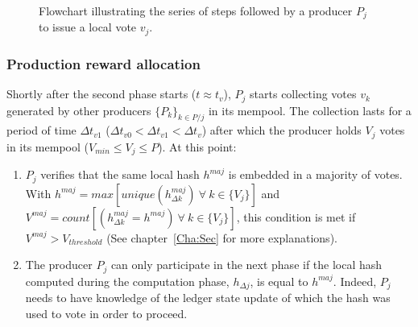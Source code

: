 \begin{enumerate}
\begin{figure}[H]
\label{fig:computation}
\caption{\label{fig:computation} Flowchart illustrating the series of steps followed by a producer $P_j$ to issue a local vote $v_j$.}
\end{figure}
\end{enumerate}

\subsubsection{Production reward allocation}

Shortly after the second phase starts ($t \approx t_v$), $P_j$ starts collecting votes $v_{k}$ generated by other producers $\{P_k\}_{k \in P/j}$ in its mempool. The collection lasts for a period of time $\Delta t_{v1}$ ($\Delta t_{v0} < \Delta t_{v1}< \Delta t_{v}$) after which the producer holds $V_j$ votes in its mempool ($V_{min} \leq V_j \leq P$). At this point:

\begin{enumerate}
\item $P_j$ verifies that the same local hash $h^{maj}$ is embedded in a majority of votes. With $h^{maj} = max[unique(h^{maj}_{\Delta k})~\forall~k\in\{V_j\}]$ and $V^{maj} = count[(h^{maj}_{\Delta k} = h^{maj})~\forall~k\in\{V_j\}]$, this condition is met if $V^{maj}  > V_{threshold}$ (See chapter~\ref{Cha:Sec} for more explanations). 
\item The producer $P_j$ can only participate in the next phase if the local hash computed during the computation phase, $h_{\Delta j}$, is equal to $h^{maj}$. Indeed, $P_j$ needs to have knowledge of the ledger state update of which the hash was used to vote in order to proceed. 
\end{enumerate}
 
